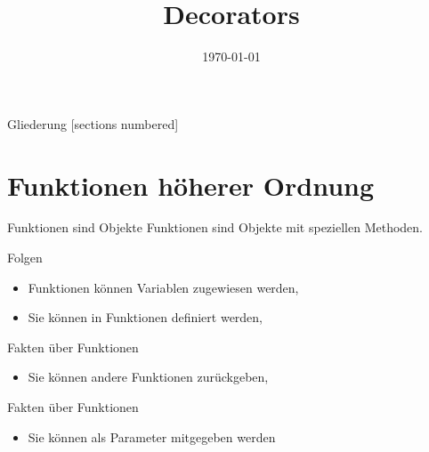 


\usepackage{comment}
\title{Decorators}
\date{\today}




\maketitle

\begin{frame}{Gliederung}
		[sections numbered]
		\tableofcontents
\end{frame}


\section{Funktionen höherer Ordnung}
\begin{frame}{Funktionen sind Objekte}
	Funktionen sind Objekte mit speziellen Methoden.
	
\end{frame}
\begin{frame}{Folgen}
	\begin{itemize}
		\item Funktionen können Variablen zugewiesen werden,
		
		\item Sie können in Funktionen definiert werden,
		
	\end{itemize}
\end{frame}
\begin{frame}{Fakten über Funktionen}
	\begin{itemize}
		\item Sie können andere Funktionen zurückgeben,
		
	\end{itemize}
\end{frame}
\begin{frame}{Fakten über Funktionen}
	\begin{itemize}
		\item Sie können als Parameter mitgegeben werden
		
	\end{itemize}
\end{frame}

